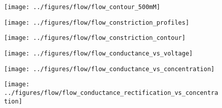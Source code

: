 \begin{figure*}[!htb]
  \centering
  \hspace{-2cm}
  \begin{minipage}[t]{5.5cm}
    \begin{subfigure}[t]{5.5cm}
      \centering
      \caption{}\vspace{-3mm}\label{fig:flow_contour}
      \texttt{[image: ../figures/flow/flow\_contour\_500mM]}
    \end{subfigure}
    \begin{subfigure}[t]{5.5cm}
      \addtocounter{subfigure}{1}
      \vspace{3mm}
      \centering
      \caption{}\vspace{-3mm}\label{fig:flow_constriction_profiles}
      \texttt{[image: ../figures/flow/flow\_constriction\_profiles]}
    \end{subfigure}
  \end{minipage}
  \begin{subfigure}[t]{4cm}
    \addtocounter{subfigure}{-2}
    \centering
    \caption{}\vspace{2mm}\label{fig:flow_constriction_contour}
    \texttt{[image: ../figures/flow/flow\_constriction\_contour]}
  \end{subfigure}
  \begin{minipage}[t]{4cm}
    \begin{subfigure}[t]{4cm}
      \addtocounter{subfigure}{1}
      \centering
      \caption{}\vspace{-5mm}\label{fig:flow_conductance_vs_voltage}
      \texttt{[image: ../figures/flow/flow\_conductance\_vs\_voltage]}
    \end{subfigure}
    \begin{subfigure}[t]{4cm}
      \vspace{2mm}
      \centering
      \caption{}\vspace{-5mm}\label{fig:flow_conductance_vs_concentration}
      \texttt{[image: ../figures/flow/flow\_conductance\_vs\_concentration]}
    \end{subfigure}
    \begin{subfigure}[t]{4cm}
      \vspace{2mm}
      \centering
      \caption{}\vspace{-5mm}\label{fig:flow_conductance_rectification_vs_concentration}
      \texttt{[image: ../figures/flow/flow\_conductance\_rectification\_vs\_concentration]}
    \end{subfigure}
  \end{minipage}
\centering


\end{figure*}
